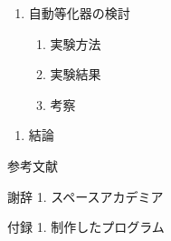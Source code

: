 \documentclass[
]{jsarticle}
\providecommand{\tightlist}{%
  \setlength{\itemsep}{0pt}\setlength{\parskip}{0pt}}
\begin{document}
\begin{enumerate}
\def\labelenumi{\arabic{enumi}.}
\setcounter{enumi}{6}
\tightlist
\item
  自動等化器の検討

  \begin{enumerate}
  \def\labelenumii{\arabic{enumii}.}
  \tightlist
  \item
    実験方法
  \item
    実験結果
  \item
    考察
  \end{enumerate}
\end{enumerate}

\begin{enumerate}
\def\labelenumi{\arabic{enumi}.}
\setcounter{enumi}{7}
\tightlist
\item
  結論
\end{enumerate}

参考文献

謝辞 1. スペースアカデミア

付録 1. 制作したプログラム
\end{document}
